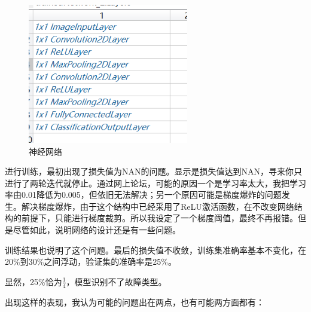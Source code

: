 \documentclass{article}
\begin{document}
	\begin{figure}[h]
		\centering
		\includegraphics[width=7cm]{figure/nn.png}
		\caption{神经网络}
	\end{figure}

	进行训练，最初出现了损失值为NAN的问题。显示是损失值达到NAN，寻来你只进行了两轮迭代就停止。通过网上论坛，可能的原因一个是学习率太大，我把学习率由0.01降低为0.005，但依旧无法解决；另一个原因可能是梯度爆炸的问题发生。解决梯度爆炸，由于这个结构中已经采用了ReLU激活函数，在不改变网络结构的前提下，只能进行梯度裁剪。所以我设定了一个梯度阈值，最终不再报错。但是尽管如此，说明网络的设计还是有一些问题。
	
	训练结果也说明了这个问题。最后的损失值不收敛，训练集准确率基本不变化，在20\%到30\%之间浮动，验证集的准确率是25\%。
	
	显然，25\%恰为$\frac{1}{4}$，模型识别不了故障类型。
	
	出现这样的表现，我认为可能的问题出在两点，也有可能两方面都有：
	
\end{document}
